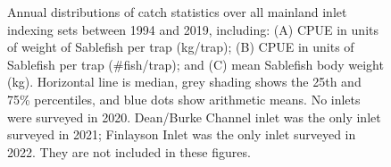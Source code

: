 \documentclass[12pt]{article}\usepackage[]{graphicx}\usepackage[]{color}
\begin{document}
\begin{figure}[htb]

{\centering {} 

}

\caption{Annual distributions of catch statistics over all mainland inlet indexing sets between 1994 and 2019, including: (A) CPUE in units of weight of Sablefish per trap (kg/trap); (B) CPUE in units of Sablefish per trap (\#fish/trap); and (C) mean Sablefish body weight (kg). Horizontal line is median, grey shading shows the 25th and 75\% percentiles, and blue dots show arithmetic means. No inlets were surveyed in 2020. Dean/Burke Channel inlet was the only inlet surveyed in 2021; Finlayson Inlet was the only inlet surveyed in 2022. They are not included in these figures.}\label{fig:figure11}
\end{figure}
\clearpage
\end{document}
